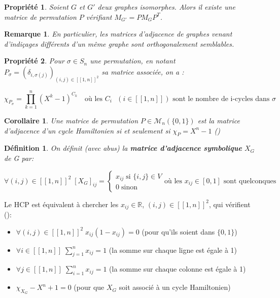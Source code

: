 \documentclass[french,a4paper]{article}
\newtheorem{definition}{Définition}[section]
\newtheorem{property}{Propriété}[section]
\newtheorem{remark}{Remarque}[section]
\newtheorem{corollary}{Corollaire}[section]
\begin{document}
\begin{property}
Soient $G$ et $G'$ deux graphes isomorphes. Alors il existe une matrice de permutation $P$ vérifiant $M_{G'}=PM_{G}P^{T}$.
\end{property}

\begin{remark}
En particulier, les matrices d'adjacence de graphes venant d'indiçages différents d'un même graphe sont orthogonalement semblables.
\end{remark}

\begin{property}
Pour $\sigma \in S_{n}$ une permutation, en notant $P_{\sigma}=(\delta_{i,\sigma (j)})_{(i,j)\in [\![1,n]\!]^{2}}$ sa matrice associée, on a :

\[
\chi_{P_{\sigma}}=\prod\limits_{k=1}^{n}(X^{k}-1)^{C_{k}} \quad \text{où les $C_{i}$ $(i \in [\![1,n]\!])$ sont le nombre de i-cycles dans $\sigma$}
\]
\end{property}

\begin{corollary}
Une matrice de permutation $P \in \mathcal{M}_{n}(\{0,1\})$ est la matrice d'adjacence d'un cycle Hamiltonien si et seulement si $\chi _{P} = X^{n}-1$ (\cite{Ejov2006SOLVINGTH})
\end{corollary}

\begin{definition}
On définit (avec abus) la \textbf{matrice d'adjacence symbolique} $X_{G}$ de G par:

\[
\forall (i,j) \in [\![1,n]\!]^2 \; [X_{G}]_{ij}=
	\begin{cases}
	x_{ij} \; \text{si $\{i,j\} \in V$}\\
	0 \; \text{sinon}
	\end{cases}
\text{où les $x_{ij} \in [0,1]$ sont quelconques}
\]
\end{definition}


Le HCP est équivalent à chercher les $x_{ij} \in \mathbb{R}$, $(i,j) \in [\![1,n]\!]^2$, qui vérifient (\cite{Ejov2006SOLVINGTH}):

\begin{itemize}
\item $\forall (i,j) \in [\![1,n]\!]^2 \; x_{ij}(1-x_{ij})=0$ \quad (pour qu'ils soient dans $\{0,1\}$)
\item $\forall i \in [\![1,n]\!] \; \sum\limits_{j=1}^{n}x_{ij}=1$ \quad (la somme sur chaque ligne est égale à 1)
\item $\forall j \in [\![1,n]\!] \; \sum\limits_{i=1}^{n}x_{ij}=1$ \quad (la somme sur chaque colonne est égale à 1)
\item $\chi_{X_{G}} - X^{n}+1=0$ \quad (pour que $X_{G}$ soit associé à un cycle Hamiltonien)
\end{itemize}
\end{document}
